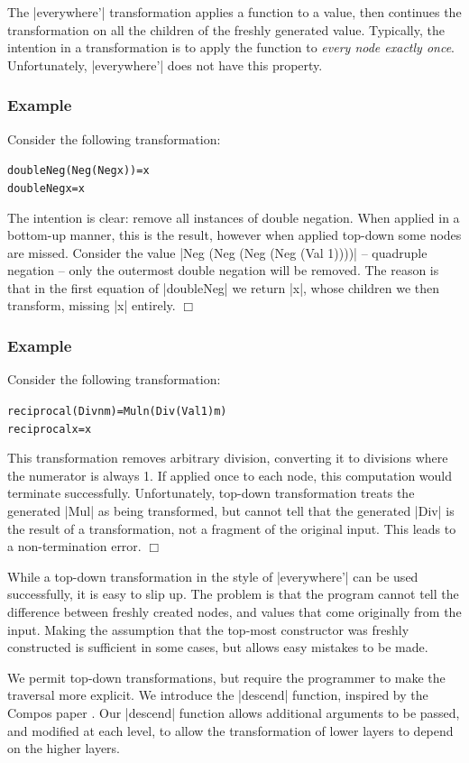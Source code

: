 \documentclass[preprint]{sigplanconf}
\let\cite=\citep
\newcounter{exmp}
\newcommand{\yesexample}{\subsubsection*{Example \arabic{exmp}}\refstepcounter{exmp}}
\newcommand{\noexample}{\hfill$\Box$}
\newenvironment{code}{\begin{alltt}\small}{\end{alltt}}
\newenvironment{example}{\yesexample}{\noexample}
\begin{document}
The |everywhere'| transformation applies a function to a value, then continues the transformation on all the children of the freshly generated value. Typically, the intention in a transformation is to apply the function to \textit{every node exactly once}. Unfortunately, |everywhere'| does not have this property.

\begin{example}
Consider the following transformation:

\begin{code}
doubleNeg (Neg (Neg x))  = x
doubleNeg x              = x
\end{code}

The intention is clear: remove all instances of double negation. When applied in a bottom-up manner, this is the result, however when applied top-down some nodes are missed. Consider the value |Neg (Neg (Neg (Neg (Val 1))))| -- quadruple negation -- only the outermost double negation will be removed. The reason is that in the first equation of |doubleNeg| we return |x|, whose children we then transform, missing |x| entirely.
\end{example}

\begin{example}
Consider the following transformation:

\begin{code}
reciprocal (Div n m)  = Mul n (Div (Val 1) m)
reciprocal x          = x
\end{code}

This transformation removes arbitrary division, converting it to divisions where the numerator is always 1. If applied once to each node, this computation would terminate successfully. Unfortunately, top-down transformation treats the generated |Mul| as  being transformed, but cannot tell that the generated |Div| is the result of a transformation, not a fragment of the original input. This leads to a non-termination error.
\end{example}

While a top-down transformation in the style of |everywhere'| can be used successfully, it is easy to slip up. The problem is that the program cannot tell the difference between freshly created nodes, and values that come originally from the input. Making the assumption that the top-most constructor was freshly constructed is sufficient in some cases, but allows easy mistakes to be made.

We permit top-down transformations, but require the programmer to make the traversal more explicit. We introduce the |descend| function, inspired by the Compos paper \cite{bringert:compos}. Our |descend| function allows additional arguments to be passed, and modified at each level, to allow the transformation of lower layers to depend on the higher layers.
\end{document}
